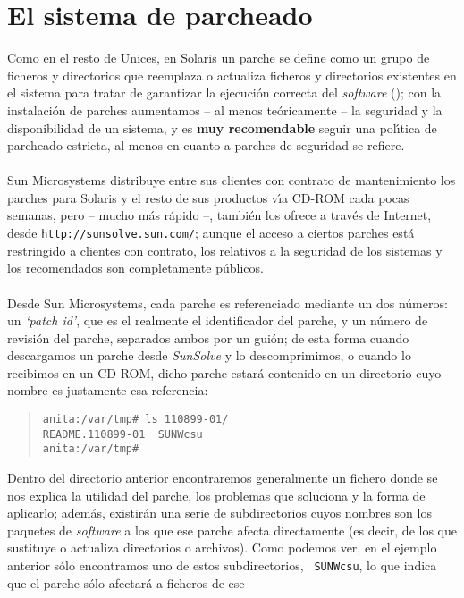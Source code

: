 \section{El sistema de parcheado}
Como en el resto de Unices, en Solaris un parche se define como un grupo de
ficheros y directorios que reemplaza o actualiza ficheros y directorios 
existentes en el sistema para tratar de garantizar la ejecuci\'on correcta del
{\it software} (\cite{kn:sun98}); con la instalaci\'on de parches aumentamos -- 
al menos te\'oricamente -- la seguridad y la disponibilidad de un sistema, y 
es {\bf muy recomendable} seguir una pol\'{\i}tica de parcheado estricta, al 
menos en cuanto a parches de seguridad se refiere.\\
\\Sun Microsystems distribuye entre sus clientes con contrato de mantenimiento 
los parches para Solaris y el resto de sus productos v\'{\i}a CD-ROM cada pocas 
semanas, pero -- mucho m\'as r\'apido --, tambi\'en 
los ofrece a trav\'es de Internet, desde {\tt http://sunsolve.sun.com/}; aunque 
el acceso a ciertos parches est\'a restringido a clientes con contrato, los 
relativos a la seguridad de los sistemas y los recomendados son completamente 
p\'ublicos.\\
\\Desde Sun Microsystems, cada parche es referenciado mediante un dos n\'umeros:
un {\it `patch id'}, que es el realmente el identificador del parche, y un 
n\'umero de revisi\'on del parche, separados ambos por un gui\'on; de esta 
forma cuando descargamos un parche desde {\it SunSolve} y lo descomprimimos, o 
cuando lo recibimos en un CD-ROM, dicho parche estar\'a contenido en un 
directorio cuyo nombre es justamente esa referencia:
\begin{quote}
\begin{verbatim}
anita:/var/tmp# ls 110899-01/
README.110899-01  SUNWcsu
anita:/var/tmp# 
\end{verbatim}
\end{quote}
Dentro del directorio anterior encontraremos generalmente un fichero donde se
nos explica la u\-ti\-li\-dad del parche, los problemas que soluciona y la 
forma de
aplicarlo; adem\'as, existir\'an una serie de subdirectorios cuyos nombres son
los paquetes de {\it software} a los que ese parche afecta directamente (es
decir, de los que sustituye o actualiza directorios o archivos). Como podemos
ver, en el ejemplo anterior s\'olo encontramos uno de estos subdirectorios, {\tt
SUNWcsu}, lo que indica que el parche s\'olo afectar\'a a ficheros de ese

